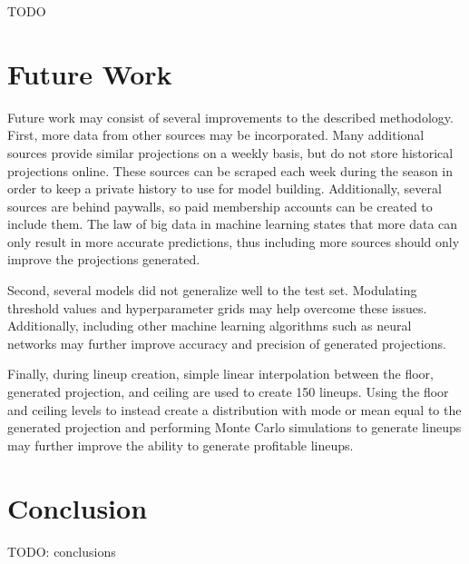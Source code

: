 \documentclass[12pt]{article}
\begin{document}
TODO



\pagebreak
\section{Future Work}
Future work may consist of several improvements to the described methodology. First, more data from other sources may be incorporated. Many additional sources provide similar projections on a weekly basis, but do not store historical projections online. These sources can be scraped each week during the season in order to keep a private history to use for model building. Additionally, several sources are behind paywalls, so paid membership accounts can be created to include them. The law of big data in machine learning states that more data can only result in more accurate predictions, thus including more sources should only improve the projections generated.\bigskip

Second, several models did not generalize well to the test set. Modulating threshold values and hyperparameter grids may help overcome these issues. Additionally, including other machine learning algorithms such as neural networks may further improve accuracy and precision of generated projections.\bigskip

Finally, during lineup creation, simple linear interpolation between the floor, generated projection, and ceiling are used to create 150 lineups. Using the floor and ceiling levels to instead create a distribution with mode or mean equal to the generated projection and performing Monte Carlo simulations to generate lineups may further improve the ability to generate profitable lineups.

\section{Conclusion}
TODO: conclusions

\end{document}

